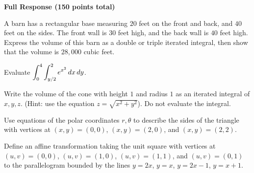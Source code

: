 \documentclass[12pt]{exam}
\newcommand{\ds}{\ensuremath{\displaystyle}}
\newcommand{\<}{\langle}
\renewcommand{\>}{\rangle}
\newcommand{\dvar}{\,d}
\begin{document}
\vfill
\newpage






\begin{center}
  \textbf{Full Response (150 points total)}
\end{center}

\begin{questions}

\setcounter{question}{5}

\question[30]
  A barn has a rectangular base measuring \(20\) feet on the front and back,
  and \(40\) feet on the sides. The front wall is \(30\) feet high, and
  the back wall is \(40\) feet high. Express the volume of this barn as
  a double or triple iterated integral, then show that the volume is
  \(28,000\) cubic feet.

  \vfill



\newpage

\question[30]
  Evaluate \(\ds\int_0^4\int_{y/2}^2 e^{x^2}\dvar x\dvar y\).

  \vfill



\newpage

\question[30]
  Write the volume of the cone with height \(1\) and radius \(1\) as an
  iterated integral of \(x,y,z\). (Hint: use the equation \(z=\sqrt{x^2+y^2}\)).
  Do not evaluate the integral.

  \vfill



\newpage

\question[30]
  Use equations of the polar coordinates \(r,\theta\) to describe the sides
  of the triangle
  with vertices at \((x,y)=(0,0)\), \((x,y)=(2,0)\), and \((x,y)=(2,2)\).


\newpage

\question[30]
  Define an affine transformation
  taking the unit square with vertices at \((u,v)=(0,0)\),
  \((u,v)=(1,0)\), \((u,v)=(1,1)\), and \((u,v)=(0,1)\) to the parallelogram
  bounded by the lines \(y=2x\), \(y=x\), \(y=2x-1\), \(y=x+1\).

\end{questions}
\end{document}
